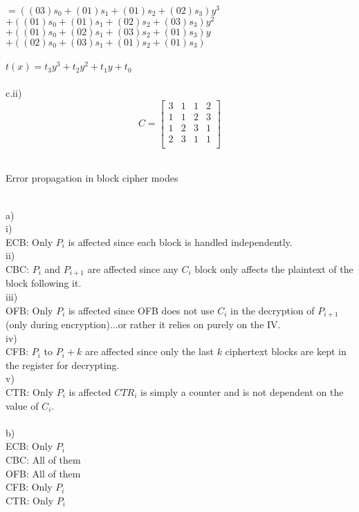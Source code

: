\documentclass{assignment}
\begin{document}
\begin{problemlist}
\begin{problem}
\begin{answer}
\\
$=((03)s_0+(01)s_1+(01)s_2+(02)s_3)y^3$\\
$+((01)s_0+(01)s_1+(02)s_2+(03)s_3)y^2$\\
$+((01)s_0+(02)s_1+(03)s_2+(01)s_3)y$\\
$+((02)s_0+(03)s_1+(01)s_2+(01)s_3)$\\
\\
$t(x)=t_3y^3+t_2y^2+t_1y+t_0$\\
\\
c.ii)\\
\[
C=
\begin{bmatrix}
3 & 1 & 1 & 2 \\
1 & 1 & 2 & 3\\
1 & 2 & 3 & 1\\
2 & 3 & 1 & 1\\
\end{bmatrix}
\]
\\
\end{answer}
\end{problem}

\pbitem Error propagation in block cipher modes
\begin{problem}
\begin{answer}
\\
a)\\
i)\\
ECB: Only $P_i$ is affected since each block is handled independently.\\
ii)\\
CBC: $P_i$ and $P_{i+1}$ are affected since any $C_i$ block only affects the plaintext of the block following it.\\
iii)\\
OFB: Only $P_i$ is affected since OFB does not use $C_i$ in the decryption of $P_{i+1}$ (only during encryption)...or rather it relies on purely on the IV.\\
iv)\\
CFB: $P_i$ to $P_i+k$ are affected since only the last $k$ ciphertext blocks are kept in the register for decrypting.\\
v)\\
CTR: Only $P_i$ is affected $CTR_i$ is simply a counter and is not dependent on the value of $C_i$.\\
\\
b)\\
ECB: Only $P_i$\\
CBC: All of them\\
OFB: All of them\\
CFB: Only $P_i$\\
CTR: Only $P_i$\\
\\
\end{answer}
\end{problem}

\end{problemlist}
\end{document}
